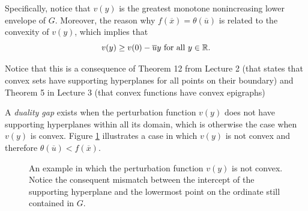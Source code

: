 Specifically, notice that $v(y)$ is the greatest monotone nonincreasing lower envelope of $G$. Moreover, the reason why $f(\overline{x}) = \theta(\overline{u})$ is related to the convexity of $v(y)$, which implies that 
$$
	v(y) \geq v(0) - \overline{u}y \text{ for all } y \in \mathbb{R}.
$$

Notice that this is a consequence of Theorem 12 from Lecture 2 (that states that convex sets have supporting hyperplanes for all points on their boundary) and Theorem 5 in Lecture 3 (that convex functions have convex epigraphs)

A \emph{duality gap} exists when the perturbation function $v(y)$ does not have supporting hyperplanes within all its domain, which is otherwise the case when $v(y)$ is convex. Figure \ref{fig:nonconvex_G} illustrates a case in which $v(y)$ is not convex and therefore $\theta(\overline{u}) < f(\overline{x})$.

\begin{figure}[h]
			 \label{fig:nonconvex_G}
			\caption{An example in which the perturbation function $v(y)$ is not convex. Notice the consequent mismatch between the intercept of the supporting hyperplane and the lowermost point on the ordinate still contained in $G$.} \label{fig:nonconvex_G}
	\end{figure}


